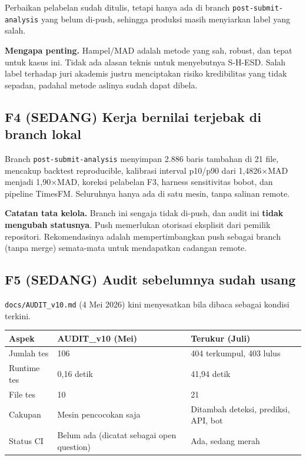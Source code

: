 \documentclass[11pt,a4paper]{article}
\newcommand{\code}[1]{\texttt{\small #1}}
\newcommand{\sevM}{\textcolor{sevmed}{\textbf{SEDANG}}}
\begin{document}
\noindent
Perbaikan pelabelan sudah ditulis, tetapi hanya ada di branch \code{post-submit-analysis} yang
belum di-push, sehingga produksi masih menyiarkan label yang salah.

\noindent
\textbf{Mengapa penting.} Hampel/MAD adalah metode yang sah, robust, dan tepat untuk kasus ini.
Tidak ada alasan teknis untuk menyebutnya S-H-ESD. Salah label terhadap juri akademis justru
menciptakan risiko kredibilitas yang tidak sepadan, padahal metode aslinya sudah dapat dibela.

\subsection{F4 (\sevM) Kerja bernilai terjebak di branch lokal}
\label{sec:f4}

Branch \code{post-submit-analysis} menyimpan 2.886 baris tambahan di 21 file, mencakup backtest
reproducible, kalibrasi interval p10/p90 dari 1,4826$\times$MAD menjadi 1,90$\times$MAD, koreksi
pelabelan F3, harness sensitivitas bobot, dan pipeline TimesFM. Seluruhnya hanya ada di satu
mesin, tanpa salinan remote.

\noindent
\textbf{Catatan tata kelola.} Branch ini sengaja tidak di-push, dan audit ini
\textbf{tidak mengubah statusnya}. Push memerlukan otorisasi eksplisit dari pemilik repositori.
Rekomendasinya adalah mempertimbangkan push sebagai branch (tanpa merge) semata-mata untuk
mendapatkan cadangan remote.

\subsection{F5 (\sevM) Audit sebelumnya sudah usang}
\label{sec:f5}

\code{docs/AUDIT\_v10.md} (4 Mei 2026) kini menyesatkan bila dibaca sebagai kondisi terkini.

\begin{center}
\begin{tabular}{@{}p{5.0cm}p{4.6cm}p{5.0cm}@{}}
\toprule
\textbf{Aspek} & \textbf{AUDIT\_v10 (Mei)} & \textbf{Terukur (Juli)} \\
\midrule
Jumlah tes & 106 & 404 terkumpul, 403 lulus \\
Runtime tes & 0,16 detik & 41,94 detik \\
File tes & 10 & 21 \\
Cakupan & Mesin pencocokan saja & Ditambah deteksi, prediksi, API, bot \\
Status CI & Belum ada (dicatat sebagai open question) & Ada, sedang merah \\
\bottomrule
\end{tabular}
\end{center}
\end{document}
